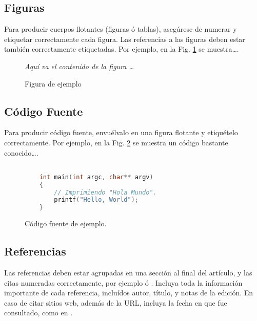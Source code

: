 \documentclass[a4paper,10pt,twocolumn]{article}
\begin{document}
	\subsection{Figuras}\label{sub:figures}
		Para producir cuerpos flotantes (figuras ó tablas), asegúrese de numerar
		y etiquetar correctamente cada figura. Las referencias a las figuras deben
		estar también correctamente etiquetadas. Por ejemplo, en la Fig. \ref{fig:ex}
		se muestra\ldots.

		\begin{figure}[htb]%
		\begin{center}
			\emph{Aquí va el contenido de la figura \ldots}
		\end{center}
		\caption{Figura de ejemplo \label{fig:ex}}%
		\end{figure}

	\subsection{Código Fuente}\label{sub:listings}
		Para producir código fuente, envuélvalo en una figura flotante y
		etiquételo correctamente. Por ejemplo, en la Fig. \ref{fig:code}
		se muestra un código bastante conocido\ldots.


		\begin{figure}[htb]%
			\begin{lstlisting}[language=c]%

    int main(int argc, char** argv)
    {
        // Imprimiendo "Hola Mundo".
        printf("Hello, World");
    }

			\end{lstlisting}
		\caption{Código fuente de ejemplo.\label{fig:code}}
		\end{figure}

	\subsection{Referencias}
  	Las referencias deben estar agrupadas en una sección al final del artículo,
  	y las citas numeradas correctamente, por ejemplo \cite{knuth} ó \cite{goedel}.
  	Incluya toda la información importante de cada referencia, incluídos autor,
  	título, y notas de la edición. En caso de citar sitios web, además
  	de la URL, incluya la fecha en que fue consultado, como en \cite{wiki}.
\end{document}
